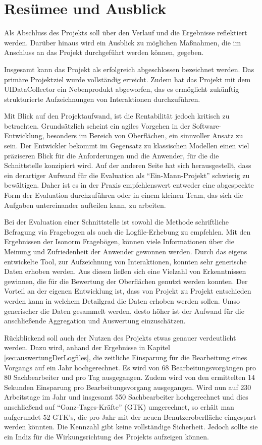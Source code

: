 \section{Resümee und Ausblick}
Als Abschluss des Projekts soll über den Verlauf und die Ergebnisse reflektiert werden. Darüber hinaus wird ein Ausblick zu möglichen Maßnahmen, die im Anschluss an das Projekt durchgeführt werden können, gegeben.

Insgesamt kann das Projekt als erfolgreich abgeschlossen bezeichnet werden. Das primäre Projektziel wurde vollständig erreicht. Zudem hat das Projekt mit dem UIDataCollector ein Nebenprodukt abgeworfen, das es ermöglicht zukünftig strukturierte Aufzeichnungen von Interaktionen durchzuführen.

Mit Blick auf den Projektaufwand, ist die Rentabilität jedoch kritisch zu betrachten. Grundsätzlich scheint ein agiles Vorgehen in der Software-Entwicklung, besonders im Bereich von Oberflächen, ein sinnvoller Ansatz zu sein. Der Entwickler bekommt im Gegensatz zu klassischen Modellen einen viel präziseren Blick für die Anforderungen und die Anwender, für die die Schnittstelle konzipiert wird. Auf der anderen Seite hat sich herausgestellt, dass ein derartiger Aufwand für die Evaluation als \enquote{Ein-Mann-Projekt} schwierig zu bewältigen. Daher ist es in der Praxis empfehlenswert entweder eine abgespeckte Form der Evaluation durchzuführen oder in einem kleinen Team, das sich die Aufgaben untereinander aufteilen kann, zu arbeiten. 

Bei der Evaluation einer Schnittstelle ist sowohl die Methode schriftliche Befragung via Fragebogen als auch die Logfile-Erhebung zu empfehlen. Mit den Ergebnissen der Isonorm Fragebögen, können viele Informationen über die Meinung und Zufriedenheit der Anwender gewonnen werden. Durch das eigens entwickelte Tool, zur Aufzeichnung von Interaktionen, konnten sehr generische Daten erhoben werden. Aus diesen ließen sich eine Vielzahl von Erkenntnissen gewinnen, die für die Bewertung der Oberflächen genutzt werden konnten. Der Vorteil an der eigenen Entwicklung ist, dass von Projekt zu Projekt entschieden werden kann in welchem Detailgrad die Daten erhoben werden sollen. Umso generischer die Daten gesammelt werden, desto höher ist der Aufwand für die anschließende Aggregation und Auswertung einzuschätzen.

Rückblickend soll auch der Nutzen des Projekts etwas genauer verdeutlicht werden. Dazu wird, anhand der Ergebnisse in Kapitel \ref{sec:auswertungDerLogfiles}, die zeitliche Einsparung für die Bearbeitung eines Vorgangs auf ein Jahr hochgerechnet. Es wird von 68 Bearbeitungsvorgängen pro 80 Sachbearbeiter und pro Tag ausgegangen. Zudem wird von den ermittelten 14 Sekunden Einsparung pro Bearbeitungsvorgang ausgegangen. Wird nun auf 230 Arbeitstage im Jahr und insgesamt 550 Sachbearbeiter hochgerechnet und dies anschließend auf \enquote{Ganz-Tages-Kräfte} (GTK) umgerechnet, so erhält man aufgerundet 52 GTK's, die pro Jahr mit der neuen Benutzeroberfläche eingespart werden könnten. Die Kennzahl gibt keine vollständige Sicherheit. Jedoch sollte sie ein Indiz für die Wirkungsrichtung des Projekts aufzeigen können.

